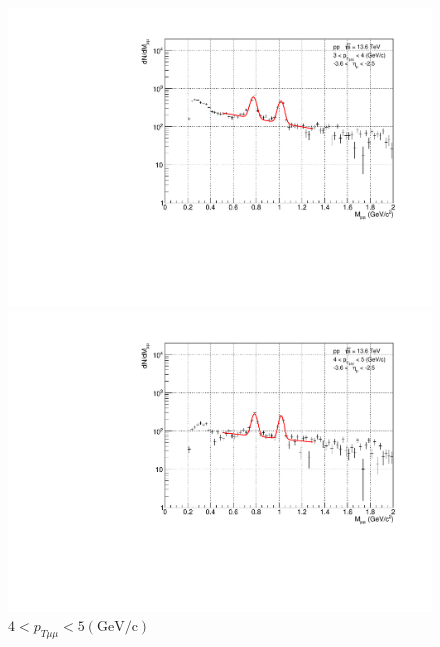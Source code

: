 \begin{figure}[H]
\begin{minipage}{0.45\textwidth}
                        \captionsetup{labelformat=empty}
                        \caption*{$2 < p_{T\mu\mu} < 3 (\mathrm{GeV/c})$}
                    \end{minipage}
                    \\
                    \vspace{1em}
                    \begin{minipage}{0.45\textwidth}
                        \centering
                        \includegraphics[width=\textwidth]{fig/3_4_2_fit_pt_3to4.pdf}
                        \captionsetup{labelformat=empty}
                        \caption*{$3 < p_{T\mu\mu} < 4 (\mathrm{GeV/c})$}
                    \end{minipage}
                    \hfill
                    \begin{minipage}{0.45\textwidth}
                        \centering
                        \includegraphics[width=\textwidth]{fig/3_4_2_fit_pt_4to5.pdf}
                        \captionsetup{labelformat=empty}
                        \caption*{$4 < p_{T\mu\mu} < 5 (\mathrm{GeV/c})$} 
    

\end{minipage}
\end{figure}
